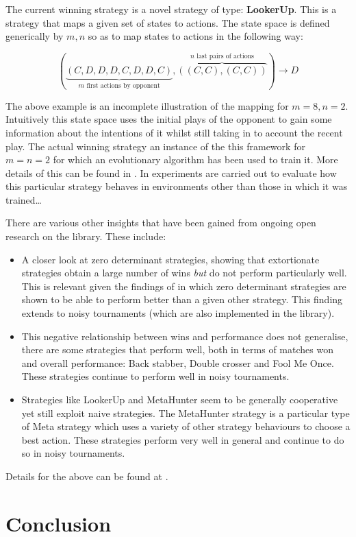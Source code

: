 \documentclass{article}
\begin{document}
The current winning strategy is a novel strategy of type: \textbf{LookerUp}. This
is a strategy that maps a given set of states to actions. The state space is
defined generically by \(m, n\) so as to map states to actions in the following
way:

\[(\underbrace{(C, D, D, D, C, D, D, C)}_{m\text{ first actions by opponent}},
\overbrace{((C, C), (C, C))}^{n\text{ last pairs of actions}}) \to D\]

The above example is an incomplete illustration of the mapping for \(m=8, n=2\).
Intuitively this state space uses the initial plays of the opponent to gain some
information about the intentions of it whilst still taking in to account the
recent play.  The actual winning strategy an instance of the this framework for
\(m=n=2\) for which an evolutionary algorithm has been used to train it. More
details of this can be found in \cite{mojones}. In \cite{} experiments are
carried out to evaluate how this particular strategy behaves in environments
other than those in which it was trained\dots

There are various other insights that have been gained from ongoing open
research on the library. These include:

\begin{itemize}
    \item A closer look at zero determinant strategies, showing that
        extortionate strategies obtain a large number of wins \textit{but} do
        not perform particularly well. This is relevant given the findings of
        \cite{Stewart2012} in which zero determinant strategies are shown to be
        able to perform better than a given other strategy. This finding extends
        to noisy tournaments (which are also implemented in the library).
    \item This negative relationship between wins and performance does not
        generalise, there are some strategies that perform well, both in terms
        of matches won and overall performance: Back stabber, Double crosser and
        Fool Me Once. These strategies continue to perform well in noisy
        tournaments.
    \item Strategies like LookerUp and MetaHunter seem to be generally
        cooperative yet still exploit naive strategies. The MetaHunter strategy
        is a particular type of Meta strategy which uses a variety of other
        strategy behaviours to choose a best action. These strategies perform
        very well in general and continue to do so in noisy tournaments.
\end{itemize}

Details for the above can be found at \cite{}.


\section{Conclusion}\label{sec:conclusion}

\printbibliography
\end{document}
